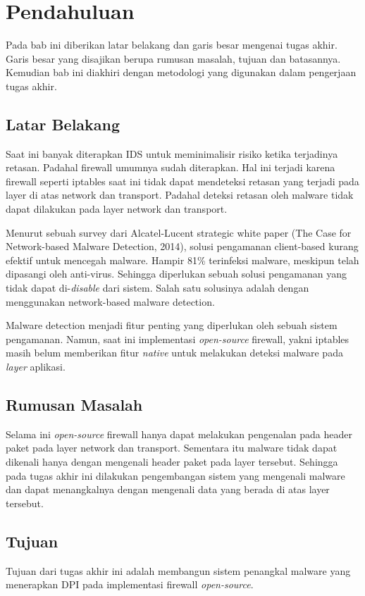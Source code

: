 \chapter{Pendahuluan}

Pada bab ini diberikan latar belakang dan garis besar mengenai tugas akhir. Garis besar yang disajikan berupa rumusan masalah, tujuan dan batasannya. Kemudian bab ini diakhiri dengan metodologi yang digunakan dalam pengerjaan tugas akhir.

\section{Latar Belakang}

Saat ini banyak diterapkan IDS untuk meminimalisir risiko ketika terjadinya retasan. Padahal firewall umumnya sudah diterapkan. Hal ini terjadi karena firewall seperti iptables saat ini tidak dapat mendeteksi retasan yang terjadi pada layer di atas network dan transport. Padahal deteksi retasan oleh malware tidak dapat dilakukan pada layer network dan transport.

Menurut sebuah survey dari Alcatel-Lucent strategic white paper (The Case for Network-based Malware Detection, 2014), solusi pengamanan client-based kurang efektif untuk mencegah malware. Hampir 81\% terinfeksi malware, meskipun telah dipasangi oleh anti-virus. Sehingga diperlukan sebuah solusi pengamanan yang tidak dapat di-\textit{disable} dari sistem. Salah satu solusinya adalah dengan menggunakan network-based malware detection.

Malware detection menjadi fitur penting yang diperlukan oleh sebuah sistem pengamanan. Namun, saat ini implementasi \textit{open-source} firewall, yakni iptables masih belum memberikan fitur \textit{native} untuk melakukan deteksi malware pada \textit{layer} aplikasi.

\section{Rumusan Masalah}

Selama ini \textit{open-source} firewall hanya dapat melakukan pengenalan pada header paket pada layer network dan transport. Sementara itu malware tidak dapat dikenali hanya dengan mengenali header paket pada layer tersebut. Sehingga pada tugas akhir ini dilakukan pengembangan sistem yang mengenali malware dan dapat menangkalnya dengan mengenali data yang berada di atas layer tersebut.

\section{Tujuan}
Tujuan dari tugas akhir ini adalah membangun sistem penangkal malware yang menerapkan DPI pada implementasi firewall \textit{open-source}.


